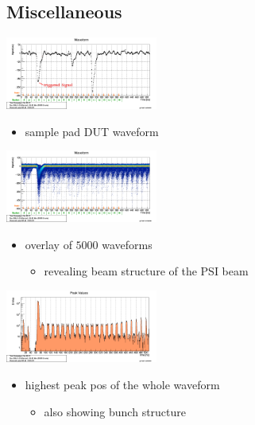 \documentclass[9pt]{beamer}
\begin{document}
\subsection{Miscellaneous}
\begin{frame}
	\begin{center}
		\begin{minipage}{5cm}
		\centering
		\includegraphics[width=5cm]{SingleWF}
		\end{minipage}
		\begin{minipage}{6cm}
			\begin{itemize}
				\item sample pad DUT waveform
			\end{itemize}
		\end{minipage}
		
		\begin{minipage}{5cm}
		\centering
		\includegraphics[width=5cm]{WaveForms5000}
		\end{minipage}
		\begin{minipage}{6cm}
			\begin{itemize}
				\item overlay of $5000$ waveforms
				\begin{itemize}
				\item revealing beam structure of the PSI beam
				\end{itemize}
			\end{itemize}
		\end{minipage}
		
		\begin{minipage}{5cm}
		\centering
		\includegraphics[width=5cm]{Pics/PeakValues}
		\end{minipage}
		\begin{minipage}{6cm}
			\begin{itemize}
				\item highest peak pos of the whole waveform
				\begin{itemize}
					\item also showing bunch structure
				\end{itemize}
			\end{itemize}
		\end{minipage}
	\end{center}
\end{frame}
\end{document}
